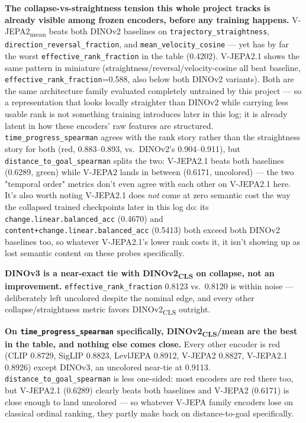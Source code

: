 \textbf{The collapse-vs-straightness tension this whole project tracks is already
visible among frozen encoders, before any training happens.} V-JEPA2\textsubscript{mean}
beats both DINOv2 baselines on \texttt{trajectory\_straightness},
\texttt{direction\_reversal\_fraction}, and \texttt{mean\_velocity\_cosine} --- yet has
by far the worst \texttt{effective\_rank\_fraction} in the table (0.4202). V-JEPA2.1
shows the same pattern in miniature (straightness/reversal/velocity-cosine all beat
baseline, \texttt{effective\_rank\_fraction}=0.588, also below both DINOv2 variants).
Both are the same architecture family evaluated completely untrained by this project ---
so a representation that looks locally straighter than DINOv2 while carrying less usable
rank is not something training introduces later in this log; it is already latent in how
these encoders' raw features are structured. \texttt{time\_progress\_spearman} agrees
with the rank story rather than the straightness story for both (red, 0.883--0.893, vs.\
DINOv2's 0.904--0.911), but \texttt{distance\_to\_goal\_spearman} splits the two: V-JEPA2.1
beats both baselines (0.6289, green) while V-JEPA2 lands in between (0.6171, uncolored)
--- the two "temporal order" metrics don't even agree with each other on V-JEPA2.1 here.
It's also worth noting V-JEPA2.1 does \emph{not} come at zero semantic cost the way the
collapsed trained checkpoints later in this log do: its \texttt{change.linear.balanced\_acc}
(0.4670) and \texttt{content+change.linear.balanced\_acc} (0.5413) both exceed both
DINOv2 baselines too, so whatever V-JEPA2.1's lower rank costs it, it isn't showing up as
lost semantic content on these probes specifically.

\textbf{DINOv3 is a near-exact tie with DINOv2\textsubscript{CLS} on collapse, not an
improvement.} \texttt{effective\_rank\_fraction} 0.8123 vs.\ 0.8120 is within noise ---
deliberately left uncolored despite the nominal edge, and every other collapse/straightness
metric favors DINOv2\textsubscript{CLS} outright.

\textbf{On \texttt{time\_progress\_spearman} specifically, DINOv2\textsubscript{CLS}/mean
are the best in the table, and nothing else comes close.} Every other encoder is red
(CLIP 0.8729, SigLIP 0.8823, LevlJEPA 0.8912, V-JEPA2 0.8827, V-JEPA2.1 0.8926) except
DINOv3, an uncolored near-tie at 0.9113. \texttt{distance\_to\_goal\_spearman} is less
one-sided: most encoders are red there too, but V-JEPA2.1 (0.6289) clearly beats both
baselines and V-JEPA2 (0.6171) is close enough to land uncolored --- so whatever V-JEPA
family encoders lose on classical ordinal ranking, they partly make back on
distance-to-goal specifically.

